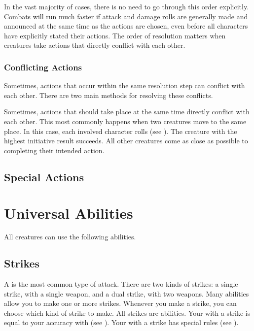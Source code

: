         In the vast majority of cases, there is no need to go through this order explicitly.
        Combats will run much faster if attack and damage rolls are generally made and announced at the same time as the actions are chosen, even before all characters have explicitly stated their actions.
        The order of resolution matters when creatures take actions that directly conflict with each other.

        \subsubsection{Conflicting Actions}\label{Conflicting Actions}

            Sometimes, actions that occur within the same resolution step can conflict with each other.
            There are two main methods for resolving these conflicts.

             Sometimes, actions that should take place at the same time directly conflict with each other.
            This most commonly happens when two creatures move to the same place.
            In this case, each involved character rolls  (see ).
            The creature with the highest initiative result succeeds.
            All other creatures come as close as possible to completing their intended action.

    \subsection{Special Actions}

\section{Universal Abilities}
    All creatures can use the following abilities.

    \subsection{Strikes}\label{Strikes}
        A  is the most common type of attack.
        There are two kinds of strikes: a single strike, with a single weapon, and a dual strike, with two weapons.
        Many abilities allow you to make one or more strikes.
        Whenever you make a strike, you can choose which kind of strike to make.
        All strikes are  abilities.
        Your  with a strike is equal to your accuracy with  (see ).
        Your  with a strike has special rules (see ).

